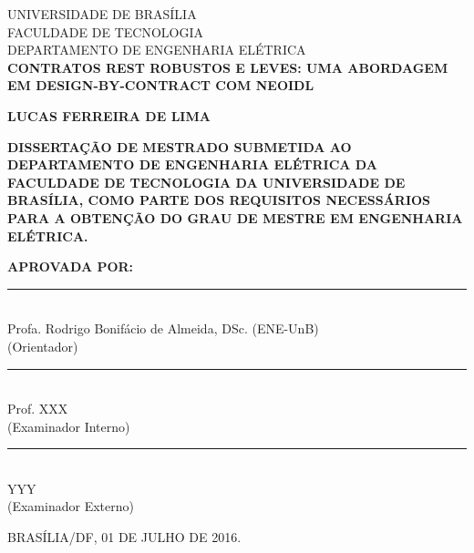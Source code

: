 \begin{bf}
\begin{center}
{\normalsize UNIVERSIDADE DE BRASÍLIA}\\
{\normalsize FACULDADE DE TECNOLOGIA}\\
{\normalsize DEPARTAMENTO DE ENGENHARIA ELÉTRICA}\\

\vspace{10mm}
{\large {\bf  CONTRATOS REST ROBUSTOS E LEVES: UMA ABORDAGEM EM
DESIGN-BY-CONTRACT COM NEOIDL }}

\vspace{10mm}
{\large {\bf LUCAS FERREIRA DE LIMA}}
\end{center}
\end{bf}

\vspace{10mm}

\noindent\MakeUppercase{ {\bf
Dissertação de Mestrado submetida ao
Departamento de Engenharia Elétrica
da Faculdade de Tecnologia da Universidade de Brasília,
como parte dos requisitos necessários para a obtenção do grau de mestre em
ENGENHARIA ELÉTRICA. }}

\vspace{5mm}

\noindent\MakeUppercase{ {\bf Aprovada por:}}

\vspace{10mm}

\begin{bf}
\noindent\rule{120mm}{0.1mm}\\
{ Profa. Rodrigo Bonifácio de Almeida, DSc. (ENE-UnB) }\\
{(Orientador)}

\vspace{7.5mm}

\noindent\rule{120mm}{0.1mm}\\
{ Prof. XXX}\\
{(Examinador Interno)}

\vspace{7.5mm}

\noindent\rule{120mm}{0.1mm}\\
{  YYY }\\
{(Examinador Externo)}

\vspace{7.5mm}

\vspace{7.5mm}
\noindent\MakeUppercase{Brasília/DF, 01 DE JULHO DE 2016.}
\end{bf}

\pagebreak


